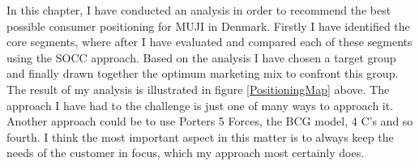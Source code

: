 In this chapter, I have conducted an analysis in order to recommend the best possible consumer positioning for MUJI in Denmark. Firstly I have identified the core segments, where after I have evaluated and compared each of these segments using the SOCC approach. Based on the analysis I have chosen a target group and finally drawn together the optimum marketing mix to confront this group. The result of my analysis is illustrated in figure \ref{PositioningMap} above. The approach I have had to the challenge is just one of many ways to approach it. Another approach could be to use Porters 5 Forces, the BCG model, 4 C's and so fourth. I think the most important aspect in this matter is to always keep the needs of the customer in focus, which my approach most certainly does. 